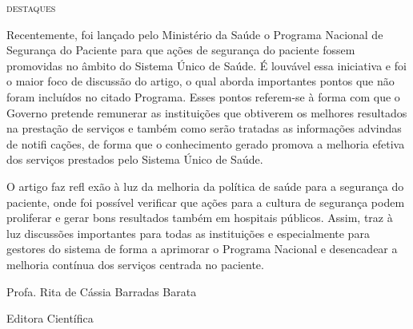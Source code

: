 \documentclass{article}
\begin{document}
\textsc{destaques}

Recentemente, foi lançado pelo Ministério da Saúde o Programa Nacional de
Segurança do
Paciente para que ações de segurança do paciente fossem promovidas no âmbito do
Sistema
Único de Saúde. É louvável essa iniciativa e foi o maior foco de discussão do
artigo, o qual
aborda importantes pontos que não foram incluídos no citado Programa. Esses
pontos
referem-se à forma com que o Governo pretende remunerar as instituições que
obtiverem os
melhores resultados na prestação de serviços e também como serão tratadas as
informações
advindas de notifi cações, de forma que o conhecimento gerado promova a melhoria
efetiva dos
serviços prestados pelo Sistema Único de Saúde.

O artigo faz refl exão à luz da melhoria da política de saúde para a segurança
do paciente,
onde foi possível verificar que ações para a cultura de segurança podem
proliferar e gerar
bons resultados também em hospitais públicos. Assim, traz à luz discussões
importantes para
todas as instituições e especialmente para gestores do sistema de forma a
aprimorar o
Programa Nacional e desencadear a melhoria contínua dos serviços centrada no
paciente.

Profa. Rita de Cássia Barradas Barata

Editora Científica
\end{document}

